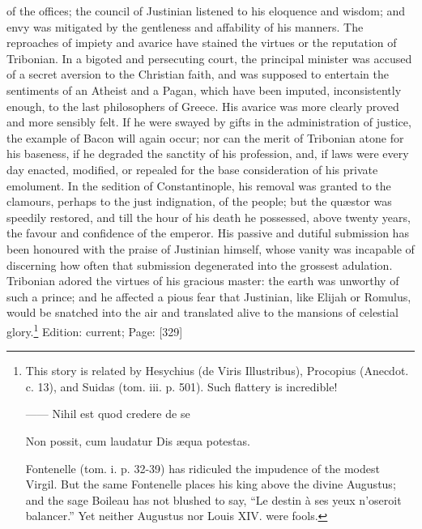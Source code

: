 of the offices; the council of Justinian listened to his eloquence and wisdom; and envy was mitigated by the gentleness and affability of his manners. The reproaches of impiety and avarice have stained the virtues or the reputation of Tribonian. In a bigoted and persecuting court, the principal minister was accused of a secret aversion to the Christian faith, and was supposed to entertain the sentiments of an Atheist and a Pagan, which have been imputed, inconsistently enough, to the last philosophers of Greece. His avarice was more clearly proved and more sensibly felt. If he were swayed by gifts in the administration of justice, the example of Bacon will again occur; nor can the merit of Tribonian atone for his baseness, if he degraded the sanctity of his profession, and, if laws were every day enacted, modified, or repealed for the base consideration of his private emolument. In the sedition of Constantinople, his removal was granted to the clamours, perhaps to the just indignation, of the people; but the quæstor was speedily restored, and till the hour of his death he possessed, above twenty years, the favour and confidence of the emperor. His passive and dutiful submission has been honoured with the praise of Justinian himself, whose vanity was incapable of discerning how often that submission degenerated into the grossest adulation. Tribonian adored the virtues of his gracious master: the earth was unworthy of such a prince; and he affected a pious fear that Justinian, like Elijah or Romulus, would be snatched into the air and translated alive to the mansions of celestial glory.\footnote{This story is related by Hesychius (de Viris Illustribus), Procopius (Anecdot. c. 13), and Suidas (tom. iii. p. 501). Such flattery is incredible!

\texthebrew{——} Nihil est quod credere de se

Non possit, cum laudatur Dis æqua potestas.

Fontenelle (tom. i. p. 32-39) has ridiculed the impudence of the modest Virgil. But the same Fontenelle places his king above the divine Augustus; and the sage Boileau has not blushed to say, \texthebrew{“}Le destin à ses yeux n\texthebrew{}’oseroit balancer.\texthebrew{}” Yet neither Augustus nor Louis XIV. were fools.}
Edition: current; Page: [329]

